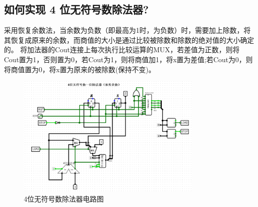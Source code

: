 \documentclass{article}
\begin{document}
    \subsection{如何实现 4 位无符号数除法器?}
    采用恢复余数法，当余数为负数（即最高为1时，为负数）时，需要加上除数，将其恢复成原来的余数，而商值的大小是通过比较被除数和除数的绝对值的大小确定的。
    将加法器的Cout连接上每次执行比较运算的MUX，若差值为正数，则将Cout置为1，否则置为0，若Cout为1，则将商值加1，将x置为差值;若Cout为0，则将商值置为0，将x置为原来的被除数(保持不变)。
    \begin{figure}[H]
        \centering
        \includegraphics[width=0.8\textwidth]{8.1.png}
        \caption{4位无符号数除法器电路图}
    \end{figure}
\end{document}
